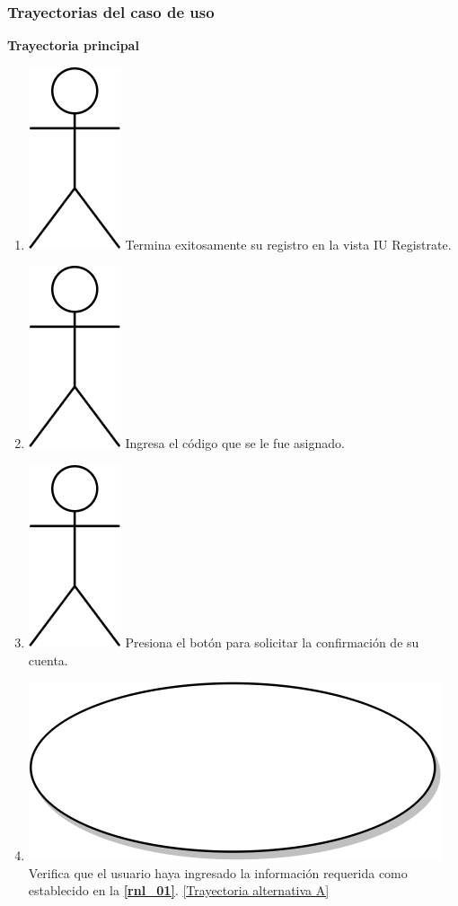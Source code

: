 \subsubsection{Trayectorias del caso de uso}
\textbf{Trayectoria principal}
\begin{enumerate}
  \item {\includegraphics[scale=.1]{Capitulo3/img/actor.png} Termina exitosamente su registro en la vista IU Registrate.}
  \item {\includegraphics[scale=.1]{Capitulo3/img/actor.png} Ingresa el código que se le fue asignado.}
  \item {\includegraphics[scale=.1]{Capitulo3/img/actor.png} Presiona el botón para solicitar la confirmación de su cuenta.}
  \item {\includegraphics[scale=.05]{Capitulo3/img/proceso.png} Verifica que el usuario haya ingresado la información requerida como establecido en la \textbf{\ref{rnl_01}}. \hyperref[cu2_1_ta_a]{[Trayectoria alternativa A]}}

\end{enumerate}
